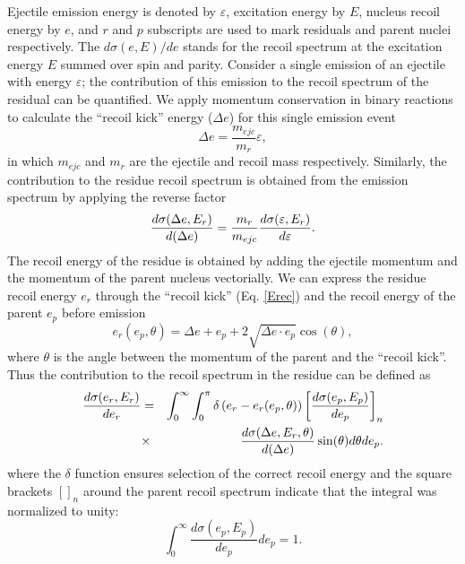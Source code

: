 Ejectile emission energy is denoted by $\varepsilon$, excitation energy by $E
$, nucleus recoil energy by $e$, and $r$ and $p$ subscripts are used to mark
residuals and parent nuclei respectively. The $d\sigma(e,E)/de$ stands for
the recoil spectrum at the excitation energy $E$ summed over spin and
parity. Consider a single emission of an ejectile with energy $\varepsilon$;
the contribution of this emission to the recoil spectrum of the residual can
be quantified. We apply momentum conservation in binary reactions to
calculate the {}``recoil kick'' energy ($\Delta e$) for this single emission
event
\begin{equation}
\Delta e=\frac{m_{ejc}}{m_{r}}\varepsilon,  \label{Erec}
\end{equation}
in which $m_{ejc}$ and $m_{r}$ are the ejectile and recoil mass
respectively. Similarly, the contribution to the residue recoil spectrum is
obtained from the emission spectrum by applying the reverse factor
\begin{equation}
\frac{d\sigma(\Delta e,E_{r})}{d(\Delta e)}=\frac{m_{r}}{m_{ejc}}\frac{%
d\sigma(\varepsilon,E_{r})}{d\varepsilon}.  \label{CSkick}
\end{equation}
The recoil energy of the residue is obtained by adding the ejectile momentum
and the momentum of the parent nucleus vectorially. We can express the
residue recoil energy $e_{r}$ through the {}``recoil kick'' (Eq. \ref{Erec})
and the recoil energy of the parent $e_{p}$ before emission
\begin{equation}
e_{r}(e_{p},\theta)=\Delta e+e_{p}+2\sqrt{\Delta e\cdot e_{p}}\cos(\theta),
\label{Eresrec}
\end{equation}
\noindent where $\theta$ is the angle between the momentum of the parent and
the {}``recoil kick''. Thus the contribution to the recoil spectrum in the
residue can be defined as
\begin{eqnarray}
\frac{d\sigma(e_{r},E_{r})}{de_{r}}&=&\int_{0}^{\infty}\int_{0}^{\pi}\delta%
\left(e_{r}-e_{r}(e_{p},\theta)\right)\left[\frac{d\sigma(e_{p},E_{p})}{%
de_{p}}\right]_{n}  \nonumber \\
&\times&\frac{d\sigma(\Delta e,E_{r},\theta)}{d(\Delta e)}%
\sin(\theta)d\theta de_{p}.  \label{CSrec}
\end{eqnarray}
\noindent where the $\delta$ function ensures selection of the correct
recoil energy and the square brackets $\left[\right]_{n}$ around the parent
recoil spectrum indicate that the integral was normalized to unity:
\begin{equation}
\int_{0}^{\infty}\frac{d\sigma(e_{p},E_{p})}{de_{p}}de_{p}=1.
\end{equation}
